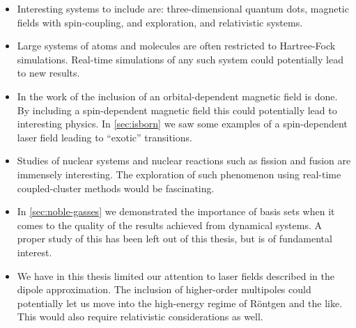             \begin{itemize}
                \item Interesting systems to include are: three-dimensional
                    quantum dots, magnetic fields with spin-coupling, and
                    exploration, and relativistic systems.
                \item Large systems of atoms and molecules are often restricted
                    to Hartree-Fock simulations.
                    Real-time simulations of any such system could potentially
                    lead to new results.
                \item In the work of \citeauthor{greg-winther}
                    \cite{greg-winther} the inclusion of an orbital-dependent
                    magnetic field is done.
                    By including a spin-dependent magnetic field this could
                    potentially lead to interesting physics.
                    In \autoref{sec:isborn} we saw some examples of a
                    spin-dependent laser field leading to ``exotic''
                    transitions.
                \item Studies of nuclear systems and nuclear reactions such as
                    fission and fusion are immensely interesting.
                    The exploration of such phenomenon using real-time
                    coupled-cluster methods would be fascinating.
                \item In \autoref{sec:noble-gasses} we demonstrated the
                    importance of basis sets when it comes to the quality of the
                    results achieved from dynamical systems.
                    A proper study of this has been left out of this thesis, but
                    is of fundamental interest.
                \item We have in this thesis limited our attention to laser
                    fields described in the dipole approximation.
                    The inclusion of higher-order multipoles could potentially
                    let us move into the high-energy regime of Röntgen and the
                    like.
                    This would also require relativistic considerations as well.
            \end{itemize}
